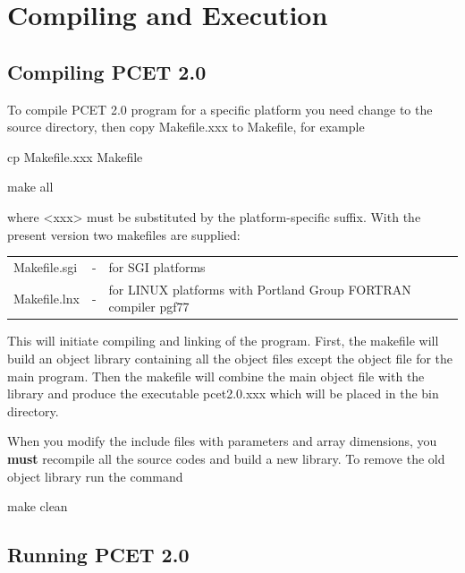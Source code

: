 \documentclass[oneside,11pt,openany]{book}
\newcommand{\tw}{\ttfamily}
\begin{document}
\chapter{Compiling and Execution}
\section{Compiling PCET 2.0}
To compile PCET 2.0 program for a specific platform you need
change to the {\tw source} directory, then
copy {\tw Makefile.xxx} to {\tw Makefile}, for example

\begin{description}
\item {\tw cp Makefile.xxx Makefile}
\item {\tw make all}
\end{description}

\noindent where {\tw <xxx>} must be substituted by
the platform-specific suffix. With the present version two
makefiles are supplied:
\par\noindent
\begin{tabular}{lcp{8cm}}
{\tw Makefile.sgi} &-& for SGI platforms \\
{\tw Makefile.lnx} &-& for LINUX platforms with Portland
      Group FORTRAN compiler {\tw pgf77} \\
\end{tabular}

This will initiate compiling and linking of the program. First,
the makefile will build an object library containing all the object
files except the object file for the main program. Then the
makefile will combine the main object file with the library
and produce the executable {\tw pcet2.0.xxx} which will
be placed in the {\tw bin} directory.

When you modify the include files with parameters and array
dimensions, you {\bf must} recompile all the source codes
and build a new library. To remove the old object library
run the command

\begin{description}
\item {\tw make clean}
\end{description}


\section{Running PCET 2.0}
\end{document}
